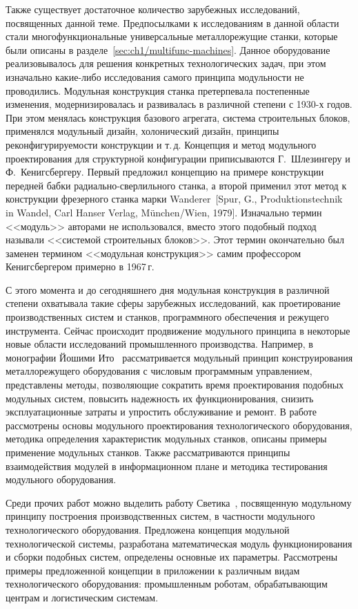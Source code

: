 Также существует достаточное количество зарубежных исследований, посвященных данной теме. Предпосылками к исследованиям в данной области стали многофункциональные универсальные металлорежущие станки, которые были описаны в разделе~\cref{sec:ch1/multifunc-machines}. Данное оборудование реализовывалось для решения конкретных технологических задач, при этом изначально какие-либо исследования самого принципа модульности не проводились. Модульная конструкция станка претерпевала постепенные изменения, модернизировалась и развивалась в различной степени с 1930-х годов. При этом менялась конструкция базового агрегата, система строительных блоков, применялся модульный дизайн, холонический дизайн, принципы реконфигурируемости конструкции и т.\,д. Концепция и метод модульного проектирования для структурной конфигурации приписываются Г.~Шлезингеру и Ф.~Кенигсбергеру. Первый предложил концепцию на примере конструкции передней бабки радиально-сверлильного станка, а второй применил этот метод к конструкции фрезерного станка марки Wanderer~[Spur, G., Produktionstechnik in Wandel, Carl Hanser Verlag, M{\"u}nchen/Wien, 1979]. Изначально термин <<модуль>> авторами не использовался, вместо этого подобный подход называли <<системой строительных блоков>>. Этот термин окончательно был заменен термином <<модульная конструкция>> самим профессором Кенигсбергером примерно в 1967\,г.

С этого момента и до сегодняшнего дня модульная конструкция в различной степени охватывала такие сферы зарубежных исследований, как проетирование производственных систем и станков, программного обеспечения и режущего инструмента. Сейчас происходит продвижение модульного принципа в некоторые новые области исследований промышленного производства. Например, в монографии Йошими Ито~\cite{ito2008modular} рассматривается модульный принцип конструирования металлорежущего оборудования с числовым программным управлением, представлены методы, позволяющие сократить время проектирования подобных модульных систем, повысить надежность их функционирования, снизить эксплуатационные затраты и упростить обслуживание и ремонт. В работе рассмотрены основы модульного проектирования технологического оборудования, методика определения характеристик модульных станков, описаны примеры применение модульных станков. Также рассматриваются принципы взаимодействия модулей в информационном плане и методика тестирования модульного оборудования.

Среди прочих работ можно выделить работу Светика~\cite{svetlik2020modularity}, посвященную модульному принципу построения производственных систем, в частности модульного технологического оборудования. Предложена концепция модульной технологической системы, разработана математическая модуль функционирования и сборки подобных систем, определены основные их параметры. Рассмотрены примеры предложенной концепции в приложении к различным видам технологического оборудования: промышленным роботам, обрабатывающим центрам и логистическим системам.

